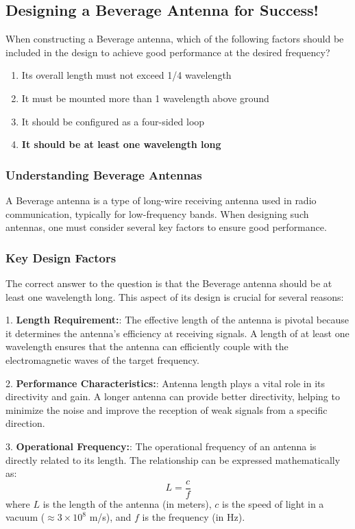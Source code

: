 \subsection{Designing a Beverage Antenna for Success!}
\begin{tcolorbox}[colback=gray!10, colframe=black, title=E9H01]
When constructing a Beverage antenna, which of the following factors should be included in the design to achieve good performance at the desired frequency?
\begin{enumerate}[label=\Alph*.]
    \item Its overall length must not exceed 1/4 wavelength
    \item It must be mounted more than 1 wavelength above ground
    \item It should be configured as a four-sided loop
    \item \textbf{It should be at least one wavelength long}
\end{enumerate} \end{tcolorbox}

\subsubsection{Understanding Beverage Antennas}
A Beverage antenna is a type of long-wire receiving antenna used in radio communication, typically for low-frequency bands. When designing such antennas, one must consider several key factors to ensure good performance.

\subsubsection{Key Design Factors}
The correct answer to the question is that the Beverage antenna should be at least one wavelength long. This aspect of its design is crucial for several reasons:

1. \textbf{Length Requirement:}: The effective length of the antenna is pivotal because it determines the antenna's efficiency at receiving signals. A length of at least one wavelength ensures that the antenna can efficiently couple with the electromagnetic waves of the target frequency.

2. \textbf{Performance Characteristics:}: Antenna length plays a vital role in its directivity and gain. A longer antenna can provide better directivity, helping to minimize the noise and improve the reception of weak signals from a specific direction.

3. \textbf{Operational Frequency:}: The operational frequency of an antenna is directly related to its length. The relationship can be expressed mathematically as:
   \[
   L = \frac{c}{f}
   \]
   where \( L \) is the length of the antenna (in meters), \( c \) is the speed of light in a vacuum (\( \approx 3 \times 10^8 \) m/s), and \( f \) is the frequency (in Hz).

